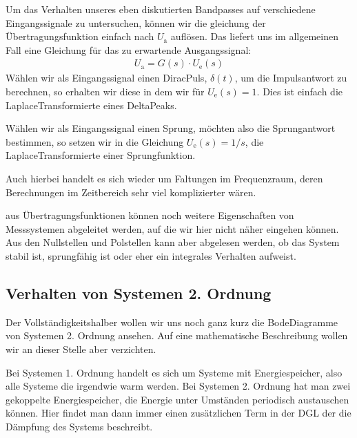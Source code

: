 \documentclass[letterpaper,10pt,english]{jupyterBook}
\begin{document}
\sphinxAtStartPar
Um das Verhalten unseres eben diskutierten Bandpasses auf verschiedene Eingangssignale zu untersuchen, können wir die gleichung der Übertragungsfunktion einfach nach \(U_\mathrm a\) auflösen. Das liefert uns im allgemeinen Fall eine Gleichung für das zu erwartende Ausgangssignal:
\begin{equation*}
\begin{split}U_\mathrm a = G(s) \cdot U_\mathrm e(s)\end{split}
\end{equation*}
\sphinxAtStartPar
Wählen wir als Eingangssignal einen Dirac\sphinxhyphen{}Puls, \(\delta(t)\), um die Impulsantwort zu berechnen, so erhalten wir diese in dem wir für \(U_\mathrm e(s) = 1\). Dies ist einfach die Laplace\sphinxhyphen{}Transformierte eines Delta\sphinxhyphen{}Peaks.

\sphinxAtStartPar
Wählen wir als Eingangssignal einen Sprung, möchten also die Sprungantwort bestimmen, so setzen wir in die Gleichung \(U_\mathrm e(s) = 1/s\), die Laplace\sphinxhyphen{}Transformierte einer Sprungfunktion.

\sphinxAtStartPar
Auch hierbei handelt es sich wieder um Faltungen im Frequenzraum, deren Berechnungen im Zeitbereich sehr viel komplizierter wären.

\sphinxAtStartPar
aus Übertragungsfunktionen können noch weitere Eigenschaften von Messsystemen abgeleitet werden, auf die wir hier nicht näher eingehen können. Aus den Nullstellen und Polstellen kann aber abgelesen werden, ob das System stabil ist, sprungfähig ist oder eher ein integrales Verhalten aufweist.

\sphinxAtStartPar
{}


\subsection{Verhalten von Systemen 2. Ordnung}
\label{\detokenize{content/5_Uebertragungsfunktion:verhalten-von-systemen-2-ordnung}}
\sphinxAtStartPar


\sphinxAtStartPar
Der Vollständigkeitshalber wollen wir uns noch ganz kurz die Bode\sphinxhyphen{}Diagramme von Systemen 2. Ordnung ansehen. Auf eine mathematische Beschreibung wollen wir an dieser Stelle aber verzichten.

\sphinxAtStartPar
Bei Systemen 1. Ordnung handelt es sich um Systeme mit Energiespeicher, also alle Systeme die irgendwie warm werden. Bei Systemen 2. Ordnung hat man zwei gekoppelte Energiespeicher, die Energie unter Umständen periodisch austauschen können. Hier findet man dann immer einen zusätzlichen Term in der DGL der die Dämpfung des Systems beschreibt.
\end{document}
